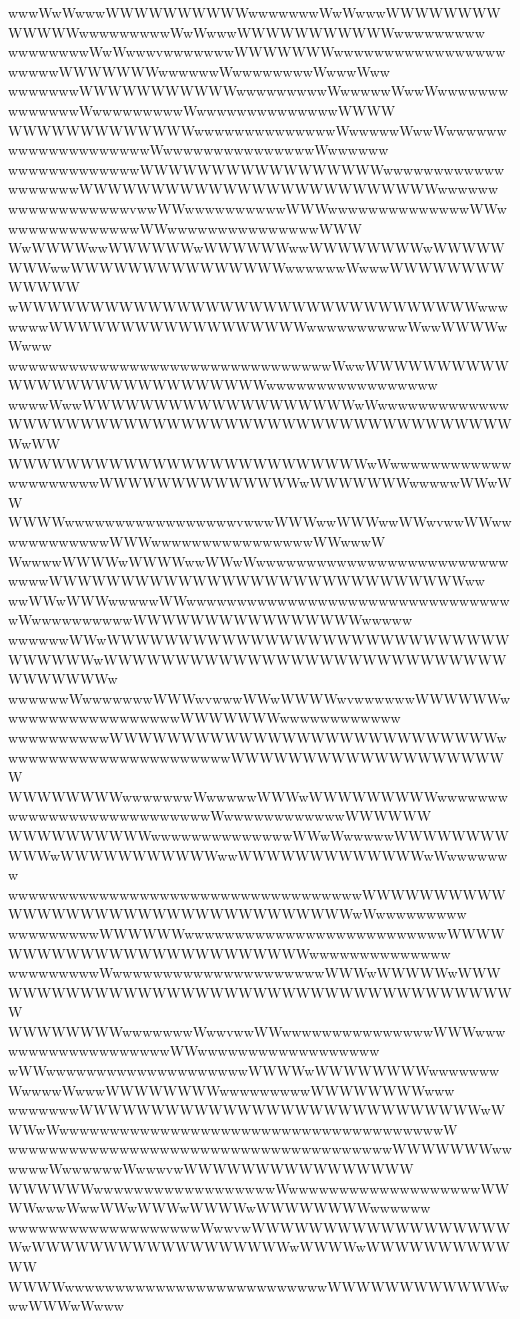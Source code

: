 \documentclass[a4paper]{article}
\begin{document}
\begin{procgrass}{\NabeAzz}
wwwWwWwwwWWWWWWWWWWwwwwwwwWwWwwwWWWWWWWWWWWWWwwwwwwwwwWwWwwwWWWWWWWWWWWwwwwwwwww
wwwwwwwwWwWwwwvwwwwwwwWWWWWWWwwwwwwwwwwwwwwwwwwwwwwWWWWWWWwwwwwwWwwwwwwwwWwwwWww
wwwwwwwWWWWWWWWWWWwwwwwwwwwWwwwwwWwwWwwwwwwwwwwwwwwWwwwwwwwwwWwwwwwwwwwwwwwwWWWW
WWWWWWWWWWWWWwwwwwwwwwwwwwwWwwwwwWwwWwwwwwwwwwwwwwwwwwwwwWwwwwwwwwwwwwwwwWwwwwww
wwwwwwwwwwwwwWWWWWWWWWWWWWWWWWwwwwwwwwwwwwwwwwwwwWWWWWWWWWWWWWWWWWWWWWWWWWwwwwww
wwwwwwwwwwwwvwwWWwwwwwwwwwwWWWwwwwwwwwwwwwwwWWwwwwwwwwwwwwwwWWwwwwwwwwwwwwwwwWWW
WwWWWWwwWWWWWWwWWWWWWwwWWWWWWWWwWWWWWWWWwwWWWWWWWWWWWWWWWwwwwwwWwwwWWWWWWWWWWWWW
wWWWWWWWWWWWWWWWWWWWWWWWWWWWWWWWWwwwwwwwWWWWWWWWWWWWWWWWWWwwwwwwwwwwWwwWWWWwWwww
wwwwwwwwwwwwwwwwwwwwwwwwwwwwwwwwWwwWWWWWWWWWWWWWWWWWWWWWWWWWWWWwwwwwwwwwwwwwwwww
wwwwWwwWWWWWWWWWWWWWWWWWWWwWwwwwwwwwwwwwwWWWWWWWWWWWWWWWWWWWWWWWWWWWWWWWWWWWWwWW
WWWWWWWWWWWWWWWWWWWWWWWWWwWwwwwwwwwwwwwwwwwwwwwwWWWWWWWWWWWWWWwWWWWWWWwwwwwWWwWW
WWWWwwwwwwwwwwwwwwwwwvwwwWWWwwWWWwwWWwvwwWWwwwwwwwwwwwwWWWwwwwwwwwwwwwwwwwWWwwwW
WwwwwWWWWwWWWWwwWWwWwwwwwwwwwwwwwwwwwwwwwwwwwwwwwWWWWWWWWWWWWWWWWWWWWWWWWWWWWWww
wwWWwWWWwwwwwWWwwwwwwwwwwwwwwwwwwwwwwwwwwwwwwwwwWwwwwwwwwwwWWWWWWWWWWWWWWWWwwwww
wwwwwwWWwWWWWWWWWWWWWWWWWWWWWWWWWWWWWWWWWWWwWWWWWWWWWWWWWWWWWWWWWWWWWWWWWWWWWWWw
wwwwwwWwwwwwwwWWWwvwwwWWwWWWWwvwwwwwwWWWWWWwwwwwwwwwwwwwwwwwwWWWWWWWwwwwwwwwwwww
wwwwwwwwwwWWWWWWWWWWWWWWWWWWWWWWWWWWWwwwwwwwwwwwwwwwwwwwwwwwWWWWWWWWWWWWWWWWWWWW
WWWWWWWWwwwwwwwWwwwwwWWWwWWWWWWWWWwwwwwwwwwwwwwwwwwwwwwwwwwwwWwwwwwwwwwwwwWWWWWW
WWWWWWWWWWwwwwwwwwwwwwwwWWwWwwwwwWWWWWWWWWWWwWWWWWWWWWWWwwWWWWWWWWWWWWWwWwwwwwww
wwwwwwwwwwwwwwwwwwwwwwwwwwwwwwwwwwwWWWWWWWWWWWWWWWWWWWWWWWWWWWWWWWWWWwWwwwwwwwww
wwwwwwwwwWWWWWWwwwwwwwwwwwwwwwwwwwwwwwwwwWWWWWWWWWWWWWWWWWWWWWWWWWwwwwwwwwwwwwww
wwwwwwwwwWwwwwwwwwwwwwwwwwwwwwwWWWwWWWWWwWWWWWWWWWWWWWWWWWWWWWWWWWWWWWWWWWWWWWWW
WWWWWWWWwwwwwwwWwwvwwWWwwwwwwwwwwwwwwwWWWwwwwwwwwwwwwwwwwwwwWWwwwwwwwwwwwwwwwwww
wWWwwwwwwwwwwwwwwwwwwwwWWWWwWWWWWWWWwwwwwwwWwwwwWwwwWWWWWWWWwwwwwwwwwWWWWWWWWwww
wwwwwwwWWWWWWWWWWWWWWWWWWWWWWWWWWWWwWWWwWwwwwwwwwwwwwwwwwwwwwwwwwwwwwwwwwwwwwwwW
wwwwwwwwwwwwwwwwwwwwwwwwwwwwwwwwwwwwwwWWWWWWWwwwwwwWwwwwwwWwwwvwWWWWWWWWWWWWWWWW
WWWWWWwwwwwwwwwwwwwwwwwwWwwwwwwwwwwwwwwwwwwwWWWWwwwWwwWWwWWWwWWWWwWWWWWWWWwwwwww
wwwwwwwwwwwwwwwwwwwWwwvwWWWWWWWWWWWWWWWWWWWwWWWWWWWWWWWWWWWWWWwWWWWwWWWWWWWWWWWW
WWWWwwwwwwwwwwwwwwwwwwwwwwwwwwWWWWWWWWWWWWwwwWWWwWwww
\end{procgrass}
\newcommand{\AhoFont}{\usefont{OT1}{cmfr}{m}{it}\LARGE}
\end{document}
